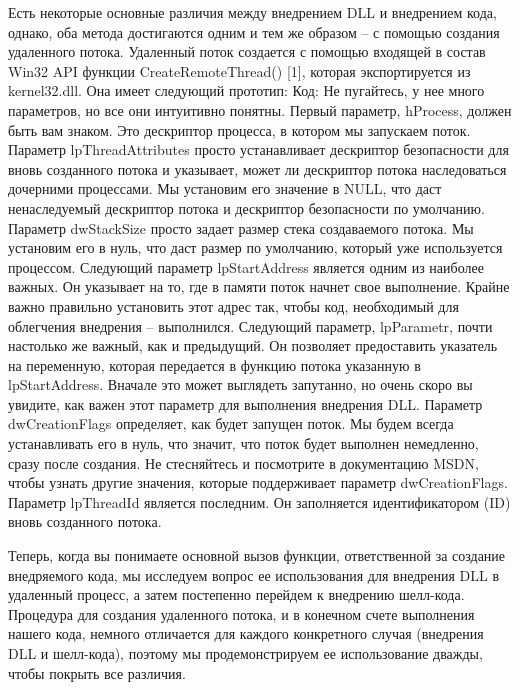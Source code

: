 \documentclass[12pt, a4paper, oneside]{book}
\begin{document}
Есть некоторые основные различия между внедрением DLL и внедрением кода, однако, оба метода достигаются одним и тем же образом – с помощью создания удаленного потока. Удаленный поток создается с помощью входящей в состав Win32 API функции CreateRemoteThread() [1], которая экспортируется из kernel32.dll. Она имеет следующий прототип:
Код:
Не пугайтесь, у нее много параметров, но все они интуитивно понятны. Первый параметр, hProcess, должен быть вам знаком. Это дескриптор процесса, в котором мы запускаем поток. Параметр lpThreadAttributes просто устанавливает дескриптор безопасности для вновь созданного потока и указывает, может ли дескриптор потока наследоваться дочерними процессами. Мы установим его значение в NULL, что даст ненаследуемый дескриптор потока и дескриптор безопасности по умолчанию. Параметр dwStackSize просто задает размер стека создаваемого потока. Мы установим его в нуль, что даст размер по умолчанию, который уже используется процессом. Следующий параметр lpStartAddress является одним из наиболее важных. Он указывает на то, где в памяти поток начнет свое выполнение. Крайне важно правильно установить этот адрес так, чтобы код, необходимый для облегчения внедрения – выполнился. Следующий параметр, lpParametr, почти настолько же важный, как и предыдущий. Он позволяет предоставить указатель на переменную, которая передается в функцию потока указанную в lpStartAddress. Вначале это может выглядеть запутанно, но очень скоро вы увидите, как важен этот параметр для выполнения внедрения DLL. Параметр dwCreationFlags определяет, как будет запущен поток. Мы будем всегда устанавливать его в нуль, что значит, что поток будет выполнен немедленно, сразу после создания. Не стесняйтесь и посмотрите в документацию MSDN, чтобы узнать другие значения, которые поддерживает параметр dwCreationFlags. Параметр lpThreadId является последним. Он заполняется идентификатором (ID) вновь созданного потока.

Теперь, когда вы понимаете основной вызов функции, ответственной за создание внедряемого кода, мы исследуем вопрос ее использования для внедрения DLL в удаленный процесс, а затем постепенно перейдем к внедрению шелл-кода. Процедура для создания удаленного потока, и в конечном счете выполнения нашего кода, немного отличается для каждого конкретного случая (внедрения DLL и шелл-кода), поэтому мы продемонстрируем ее использование дважды, чтобы покрыть все различия.
\end{document}
